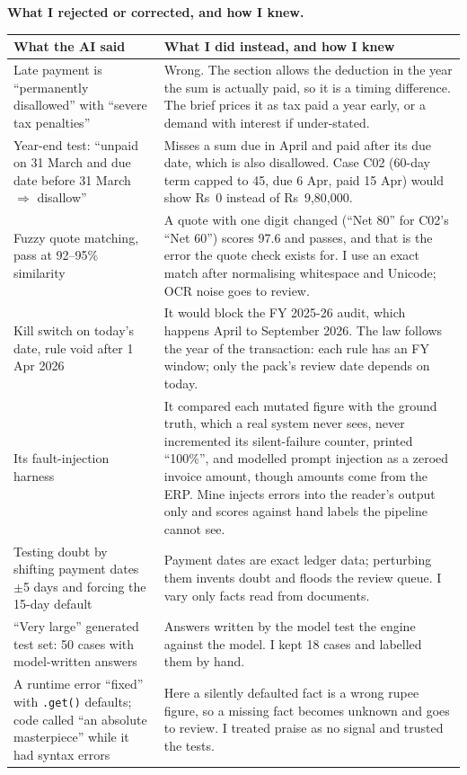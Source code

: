 \documentclass[10pt,a4paper]{article}
\begin{document}
\textbf{What I rejected or corrected, and how I knew.}
{\footnotesize
\begin{longtable}[]{@{}
  >{\raggedright\arraybackslash}p{}
  >{\raggedright\arraybackslash}p{}@{}}
\toprule\noalign{}
What the AI said & What I did instead, and how I knew \\
\midrule\noalign{}
\endhead
\bottomrule\noalign{}
\endlastfoot
Late payment is ``permanently disallowed'' with ``severe tax penalties'' & Wrong. The section allows the deduction in the year the sum is actually paid, so it is a timing difference. The brief prices it as tax paid a year early, or a demand with interest if under-stated. \\
Year-end test: ``unpaid on 31 March and due date before 31 March $\Rightarrow$ disallow'' & Misses a sum due in April and paid after its due date, which is also disallowed. Case C02 (60-day term capped to 45, due 6 Apr, paid 15 Apr) would show Rs~0 instead of Rs~9,80,000. \\
Fuzzy quote matching, pass at 92--95\% similarity & A quote with one digit changed (``Net 80'' for C02's ``Net 60'') scores 97.6 and passes, and that is the error the quote check exists for. I use an exact match after normalising whitespace and Unicode; OCR noise goes to review. \\
Kill switch on today's date, rule void after 1 Apr 2026 & It would block the FY 2025-26 audit, which happens April to September 2026. The law follows the year of the transaction: each rule has an FY window; only the pack's review date depends on today. \\
Its fault-injection harness & It compared each mutated figure with the ground truth, which a real system never sees, never incremented its silent-failure counter, printed ``100\%'', and modelled prompt injection as a zeroed invoice amount, though amounts come from the ERP. Mine injects errors into the reader's output only and scores against hand labels the pipeline cannot see. \\
Testing doubt by shifting payment dates $\pm$5 days and forcing the 15-day default & Payment dates are exact ledger data; perturbing them invents doubt and floods the review queue. I vary only facts read from documents. \\
``Very large'' generated test set: 50 cases with model-written answers & Answers written by the model test the engine against the model. I kept 18 cases and labelled them by hand. \\
A runtime error ``fixed'' with \texttt{.get()} defaults; code called ``an absolute masterpiece'' while it had syntax errors & Here a silently defaulted fact is a wrong rupee figure, so a missing fact becomes unknown and goes to review. I treated praise as no signal and trusted the tests. \\
\end{longtable}}
\end{document}

